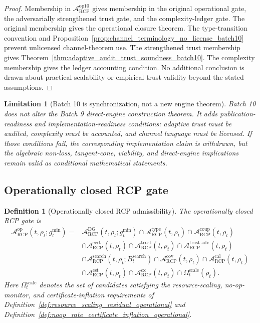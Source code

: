 \documentclass[11pt]{article}
\newtheorem{definition}[theorem]{Definition}
\newtheorem{limitation}[theorem]{Limitation}
\newcommand{\Acal}{\mathcal{A}}
\newcommand{\1}{\mathbf{1}}
\newcommand{\RCP}{\mathrm{RCP}}
\providecommand{\DG}{\mathrm{DG}}
\begin{document}
\begin{proof}
Membership in \(\Acal_{\RCP}^{\mathrm{op10}}\) gives membership in the original operational gate, the adversarially strengthened trust gate, and the complexity-ledger gate.  The original membership gives the operational closure theorem.  The type-transition convention and Proposition~\ref{prop:channel_terminology_no_license_batch10} prevent unlicensed channel-theorem use.  The strengthened trust membership gives Theorem~\ref{thm:adaptive_audit_trust_soundness_batch10}.  The complexity membership gives the ledger accounting condition.  No additional conclusion is drawn about practical scalability or empirical trust validity beyond the stated assumptions.
\end{proof}

\begin{limitation}[Batch 10 is synchronization, not a new engine theorem]
Batch 10 does not alter the Batch 9 direct-engine construction theorem.  It adds publication-readiness and implementation-readiness conditions: adaptive trust must be audited, complexity must be accounted, and channel language must be licensed.  If those conditions fail, the corresponding implementation claim is withdrawn, but the algebraic non-loss, tangent-cone, viability, and direct-engine implications remain valid as conditional mathematical statements.
\end{limitation}


\subsection{Operationally closed RCP gate}

\begin{definition}[Operationally closed RCP admissibility]
\label{def:operationally_closed_rcp_gate}
The operationally closed RCP gate is
\[
\begin{aligned}
\Acal_{\RCP}^{\mathrm{op}}(t,\rho_t;g_t^{\min})
={}&
\Acal_{\RCP}^{\DG}(t,\rho_t;g_t^{\min})
\cap \Acal_{\RCP}^{\mathrm{type}}(t,\rho_t)
\cap \Acal_{\RCP}^{\mathrm{coup}}(t,\rho_t)\\
&\cap \Acal_{\RCP}^{\mathrm{cert}}(t,\rho_t)
\cap \Acal_{\RCP}^{\mathrm{trust}}(t,\rho_t)
\cap \Acal_{\RCP}^{\mathrm{trust\mbox{-}adv}}(t,\rho_t)\\
&\cap \Acal_{\RCP}^{\mathrm{search}}(t,\rho_t;B_t^{\mathrm{search}})
\cap \Acal_{\RCP}^{\mathrm{cov}}(t,\rho_t)
\cap \Acal_{\RCP}^{\mathrm{cal}}(t,\rho_t)\\
&\cap \Acal_{\RCP}^{\mathrm{est}}(t,\rho_t)
\cap \Acal_{\RCP}^{\mathrm{cx}}(t,\rho_t)
\cap \Omega_t^{\mathrm{scale}}(\rho_t).
\end{aligned}
\]
Here \(\Omega_t^{\mathrm{scale}}\) denotes the set of candidates satisfying the resource-scaling, no-op-monitor, and certificate-inflation requirements of Definition~\ref{def:resource_scaling_residual_operational} and Definition~\ref{def:noop_rate_certificate_inflation_operational}.
\end{definition}
\end{document}
